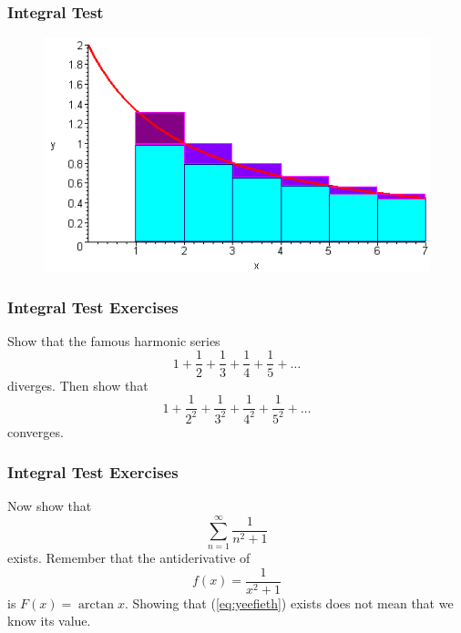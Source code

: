 \documentclass[xcolor=dvipsnames]{beamer}
\begin{document}
\begin{frame}
  \frametitle{Integral Test}
  \begin{figure}[h]
    \includegraphics[scale=0.6]{./diagrams/inttes1.png}
  \end{figure}
\end{frame}

\begin{frame}
  \frametitle{Integral Test Exercises}
  Show that the famous harmonic series
  \begin{equation}
    \label{eq:paipawai}
    1+\frac{1}{2}+\frac{1}{3}+\frac{1}{4}+\frac{1}{5}+{\ldots}
  \end{equation}
  diverges. Then show that
  \begin{equation}
    \label{eq:aiphohai}
    1+\frac{1}{2^{2}}+\frac{1}{3^{2}}+\frac{1}{4^{2}}+\frac{1}{5^{2}}+{\ldots}
  \end{equation}
  converges. 
\end{frame}

\begin{frame}
  \frametitle{Integral Test Exercises}
Now show that
  \begin{equation}
    \label{eq:yeefieth}
    \sum_{n=1}^{\infty}\frac{1}{n^{2}+1}
  \end{equation}
  exists. Remember that the antiderivative of
  \begin{equation}
    \label{eq:jaifahti}
    f(x)=\frac{1}{x^{2}+1}
  \end{equation}
is $F(x)=\arctan{}x$. Showing that (\ref{eq:yeefieth}) exists does not
mean that we know its value.
\end{frame}
\end{document}
